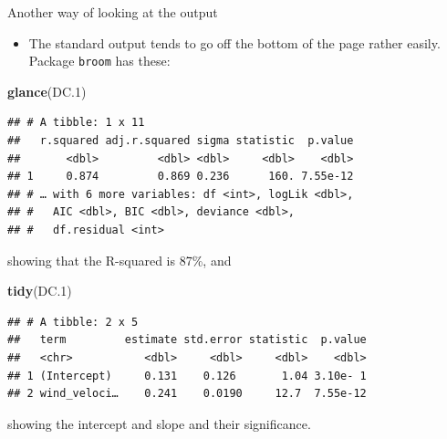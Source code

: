 \documentclass[
  ignorenonframetext,
]{beamer}
\newenvironment{Shaded}{\begin{snugshade}}{\end{snugshade}}
\newcommand{\FloatTok}[1]{\textcolor[rgb]{0.00,0.00,0.81}{#1}}
\newcommand{\KeywordTok}[1]{\textcolor[rgb]{0.13,0.29,0.53}{\textbf{#1}}}
\newcommand{\NormalTok}[1]{#1}
\providecommand{\tightlist}{%
  \setlength{\itemsep}{0pt}\setlength{\parskip}{0pt}}
\begin{document}
\begin{frame}[fragile]{Another way of looking at the output}
\protect\hypertarget{another-way-of-looking-at-the-output}{}

\begin{itemize}
\tightlist
\item
  The standard output tends to go off the bottom of the page rather
  easily. Package \texttt{broom} has these:
\end{itemize}

\footnotesize

\begin{Shaded}
\begin{Highlighting}[]
\KeywordTok{glance}\NormalTok{(DC}\FloatTok{.1}\NormalTok{)}
\end{Highlighting}
\end{Shaded}

\begin{verbatim}
## # A tibble: 1 x 11
##   r.squared adj.r.squared sigma statistic  p.value
##       <dbl>         <dbl> <dbl>     <dbl>    <dbl>
## 1     0.874         0.869 0.236      160. 7.55e-12
## # … with 6 more variables: df <int>, logLik <dbl>,
## #   AIC <dbl>, BIC <dbl>, deviance <dbl>,
## #   df.residual <int>
\end{verbatim}

\normalsize

showing that the R-squared is 87\%, and

\footnotesize

\begin{Shaded}
\begin{Highlighting}[]
\KeywordTok{tidy}\NormalTok{(DC}\FloatTok{.1}\NormalTok{)}
\end{Highlighting}
\end{Shaded}

\begin{verbatim}
## # A tibble: 2 x 5
##   term         estimate std.error statistic  p.value
##   <chr>           <dbl>     <dbl>     <dbl>    <dbl>
## 1 (Intercept)     0.131    0.126       1.04 3.10e- 1
## 2 wind_veloci…    0.241    0.0190     12.7  7.55e-12
\end{verbatim}

\normalsize

showing the intercept and slope and their significance.

\end{frame}
\end{document}
